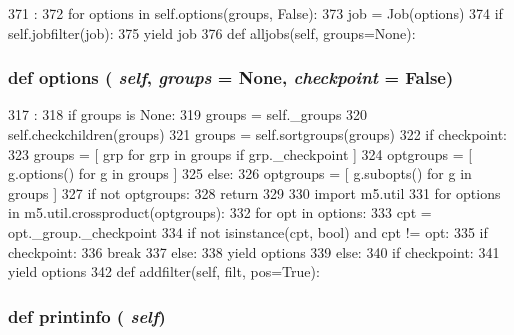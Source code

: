 \begin{DoxyCode}
371                                :
372         for options in self.options(groups, False):
373             job = Job(options)
374             if self.jobfilter(job):
375                 yield job
376 
    def alljobs(self, groups=None):
\end{DoxyCode}
\hypertarget{classm5_1_1util_1_1jobfile_1_1Configuration_a9eba36f181fad41a708f8b7658b2b173}{
\subsubsection[{options}]{\setlength{\rightskip}{0pt plus 5cm}def options ( {\em self}, \/   {\em groups} = {\ttfamily None}, \/   {\em checkpoint} = {\ttfamily False})}}
\label{classm5_1_1util_1_1jobfile_1_1Configuration_a9eba36f181fad41a708f8b7658b2b173}



\begin{DoxyCode}
317                                                     :
318         if groups is None:
319             groups = self._groups
320         self.checkchildren(groups)
321         groups = self.sortgroups(groups)
322         if checkpoint:
323             groups = [ grp for grp in groups if grp._checkpoint ]
324             optgroups = [ g.options() for g in groups ]
325         else:
326             optgroups = [ g.subopts() for g in groups ]
327         if not optgroups:
328             return
329 
330         import m5.util
331         for options in m5.util.crossproduct(optgroups):
332             for opt in options:
333                 cpt = opt._group._checkpoint
334                 if not isinstance(cpt, bool) and cpt != opt:
335                     if checkpoint:
336                         break
337                     else:
338                         yield options
339             else:
340                 if checkpoint:
341                     yield options
342 
    def addfilter(self, filt, pos=True):
\end{DoxyCode}
\hypertarget{classm5_1_1util_1_1jobfile_1_1Configuration_a40bc1aa85be1c4ba18cd144234c53984}{
\subsubsection[{printinfo}]{\setlength{\rightskip}{0pt plus 5cm}def printinfo ( {\em self})}}
\label{classm5_1_1util_1_1jobfile_1_1Configuration_a40bc1aa85be1c4ba18cd144234c53984}


